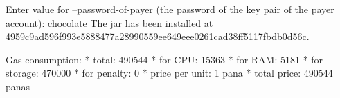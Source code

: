 \begin{shellbox}\begin{ttlst}
Enter value for --password-of-payer (the password of the key pair of the payer account): chocolate
The jar has been installed at 4959c9ad596f993e5888477a28990559ee649eee0261cad38ff5117fbdb0d56c.

Gas consumption:
 * total: 490544
   * for CPU: 15363
   * for RAM: 5181
   * for storage: 470000
   * for penalty: 0
 * price per unit: 1 pana
 * total price: 490544 panas
\end{ttlst}\end{shellbox}

